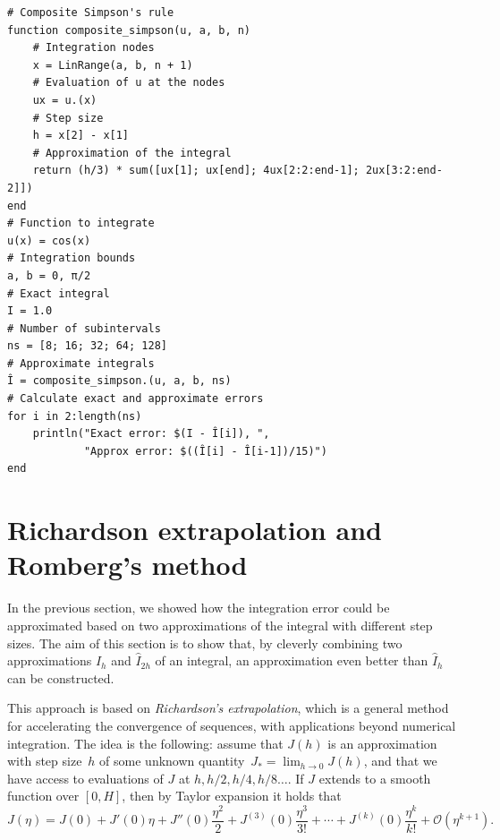 \begin{verbatim}
# Composite Simpson's rule
function composite_simpson(u, a, b, n)
    # Integration nodes
    x = LinRange(a, b, n + 1)
    # Evaluation of u at the nodes
    ux = u.(x)
    # Step size
    h = x[2] - x[1]
    # Approximation of the integral
    return (h/3) * sum([ux[1]; ux[end]; 4ux[2:2:end-1]; 2ux[3:2:end-2]])
end
# Function to integrate
u(x) = cos(x)
# Integration bounds
a, b = 0, π/2
# Exact integral
I = 1.0
# Number of subintervals
ns = [8; 16; 32; 64; 128]
# Approximate integrals
Î = composite_simpson.(u, a, b, ns)
# Calculate exact and approximate errors
for i in 2:length(ns)
    println("Exact error: $(I - Î[i]), ",
            "Approx error: $((Î[i] - Î[i-1])/15)")
end
\end{verbatim}

\section{Richardson extrapolation and Romberg's method}
In the previous section,
we showed how the integration error could be approximated based on two approximations of the integral with different step sizes.
The aim of this section is to show that,
by cleverly combining two approximations $\widehat I_h$ and $\widehat I_{2h}$ of an integral,
an approximation even better than $\widehat I_h$ can be constructed.

This approach is based on \emph{Richardson's extrapolation},
which is a general method for accelerating the convergence of sequences,
with applications beyond numerical integration.
The idea is the following:
assume that $J(h)$ is an approximation with step size~$h$ of some unknown quantity~$J_* = \lim_{h\to 0} J(h)$,
and that we have access to evaluations of $J$ at $h, h/2, h/4, h/8 \dotsc$.
If $J$ extends to a smooth function over $[0, H]$,
then by Taylor expansion it holds that
\[
    J(\eta) = J(0) + J'(0) \eta + J''(0) \frac{\eta^2}{2} + J^{(3)}(0) \frac{\eta^3}{3!} + \dotsb + J^{(k)}(0) \frac{\eta^k}{k!} + \mathcal O(\eta^{k+1}).
\]

